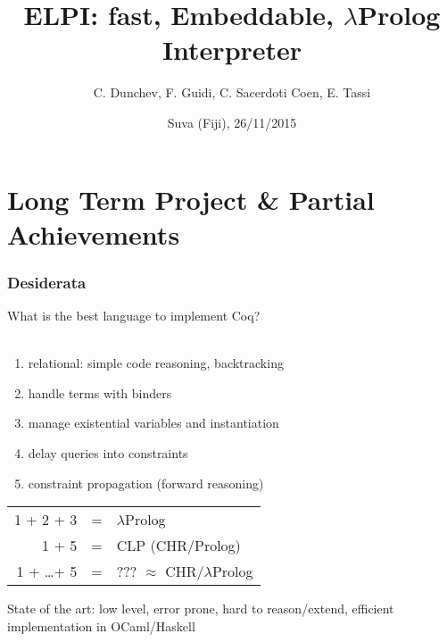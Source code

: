 \documentclass{beamer}
\title{ELPI: fast, Embeddable, $\lambda$Prolog Interpreter }
\author[Claudio Sacerdoti Coen]{C. Dunchev, F. Guidi, C. Sacerdoti Coen, E. Tassi}
\institute[University of Bologna, INRIA]
{
  University of Bologna \& INRIA Sophia-Antipolis
}
\date {Suva (Fiji), 26/11/2015}
\begin{document}
\begin{frame}
  \titlepage
\end{frame}

\section{Long Term Project \& Partial Achievements}

\begin{frame}
 \frametitle{Desiderata}
 What is the best language to implement Coq?\\~\\

 \begin{enumerate}
  \item \alert{relational}: simple code reasoning, \alert{backtracking}
  \item handle terms with \alert{binders}
  \item manage \alert{existential variables} and instantiation
  \item delay queries into \alert{constraints}
  \item \alert{constraint propagation (forward reasoning)}
 \end{enumerate}

 \begin{center}
 \begin{tabular}{rcl}
 1 + 2 + 3 & = & $\lambda$Prolog\\
 1 + 5 & = & CLP (CHR/Prolog)\\
 1 + \ldots + 5 & = & \alert{???} $\approx$ CHR/$\lambda$Prolog
 \end{tabular}
 \end{center}

 State of the art: low level, error prone, hard to reason/extend, efficient
 implementation in OCaml/Haskell
\end{frame}

%
%
%
%
\end{document}

